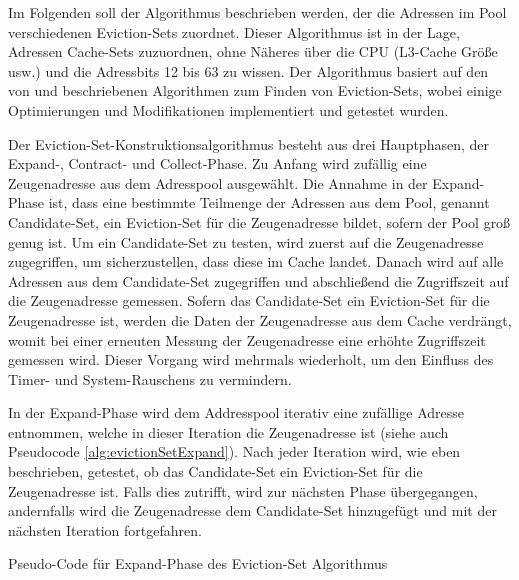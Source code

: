Im Folgenden soll der Algorithmus beschrieben werden, der die Adressen im Pool verschiedenen Eviction-Sets zuordnet.
Dieser Algorithmus ist in der Lage, Adressen Cache-Sets zuzuordnen, ohne Näheres über die CPU (L3-Cache Größe usw.) und die Adressbits 12 bis 63 zu wissen.
Der Algorithmus basiert auf den von \cite{DriveByPaper} und \cite{PrimeAndAbort} beschriebenen Algorithmen zum Finden von Eviction-Sets, wobei einige Optimierungen und Modifikationen implementiert und getestet wurden.

Der Eviction-Set-Konstruktionsalgorithmus besteht aus drei Hauptphasen, der Expand-, Contract- und Collect-Phase. 
Zu Anfang wird zufällig eine Zeugenadresse aus dem Adresspool ausgewählt.
Die Annahme in der Expand-Phase ist, dass eine bestimmte Teilmenge der Adressen aus dem Pool, genannt Candidate-Set, ein Eviction-Set für die Zeugenadresse bildet, sofern der Pool groß genug ist. 
Um ein Candidate-Set zu testen, wird zuerst auf die Zeugenadresse zugegriffen, um sicherzustellen, dass diese im Cache landet.
Danach wird auf alle Adressen aus dem Candidate-Set zugegriffen und abschließend die Zugriffszeit auf die Zeugenadresse gemessen. 
Sofern das Candidate-Set ein Eviction-Set für die Zeugenadresse ist, werden die Daten der Zeugenadresse aus dem Cache verdrängt, womit bei einer erneuten Messung der Zeugenadresse eine erhöhte Zugriffszeit gemessen wird.
Dieser Vorgang wird mehrmals wiederholt, um den Einfluss des Timer- und System-Rauschens zu vermindern.

In der Expand-Phase wird dem Addresspool iterativ eine zufällige Adresse entnommen, welche in dieser Iteration die Zeugenadresse ist (siehe auch Pseudocode \ref{alg:evictionSetExpand}).
Nach jeder Iteration wird, wie eben beschrieben, getestet, ob das Candidate-Set ein Eviction-Set für die Zeugenadresse ist.
Falls dies zutrifft, wird zur nächsten Phase übergegangen, andernfalls wird die Zeugenadresse dem Candidate-Set hinzugefügt und mit der nächsten Iteration fortgefahren.

\begin{algorithm}[h]
\DontPrintSemicolon
\caption{Pseudo-Code für Expand-Phase des Eviction-Set Algorithmus}
\label{alg:evictionSetExpand}

\end{algorithm}

